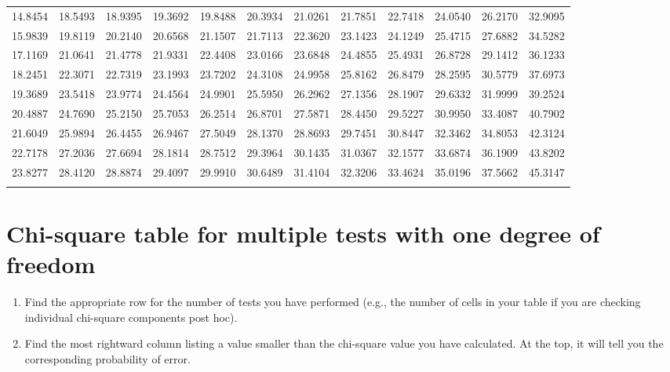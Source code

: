 \begin{table}[H]
{\begin{tabular}[t]{*{12}{S[table-format=2.4]}}
14.8454 & 18.5493 & 18.9395 & 19.3692 & 19.8488 & 20.3934 & 21.0261 & 21.7851 & 22.7418 & 24.0540 & 26.2170 & 32.9095 \\
15.9839 & 19.8119 & 20.2140 & 20.6568 & 21.1507 & 21.7113 & 22.3620 & 23.1423 & 24.1249 & 25.4715 & 27.6882 & 34.5282 \\
17.1169 & 21.0641 & 21.4778 & 21.9331 & 22.4408 & 23.0166 & 23.6848 & 24.4855 & 25.4931 & 26.8728 & 29.1412 & 36.1233 \\
18.2451 & 22.3071 & 22.7319 & 23.1993 & 23.7202 & 24.3108 & 24.9958 & 25.8162 & 26.8479 & 28.2595 & 30.5779 & 37.6973 \\
19.3689 & 23.5418 & 23.9774 & 24.4564 & 24.9901 & 25.5950 & 26.2962 & 27.1356 & 28.1907 & 29.6332 & 31.9999 & 39.2524 \\
20.4887 & 24.7690 & 25.2150 & 25.7053 & 26.2514 & 26.8701 & 27.5871 & 28.4450 & 29.5227 & 30.9950 & 33.4087 & 40.7902 \\
21.6049 & 25.9894 & 26.4455 & 26.9467 & 27.5049 & 28.1370 & 28.8693 & 29.7451 & 30.8447 & 32.3462 & 34.8053 & 42.3124 \\
22.7178 & 27.2036 & 27.6694 & 28.1814 & 28.7512 & 29.3964 & 30.1435 & 31.0367 & 32.1577 & 33.6874 & 36.1909 & 43.8202 \\
23.8277 & 28.4120 & 28.8874 & 29.4097 & 29.9910 & 30.6489 & 31.4104 & 32.3206 & 33.4624 & 35.0196 & 37.5662 & 45.3147 \\
\lspbottomrule
\end{tabular}}
\end{table}

\pagebreak

\section{Chi-square table for multiple tests with one degree of freedom}
\label{sec:chisquaremultiple}

\begin{enumerate}
  \item Find the appropriate row for the number of tests you have performed (e.g., the number of cells in your table if you are checking individual chi-square components post hoc).
  \item Find the most rightward column listing a value smaller than the chi-square value you have calculated. At the top, it will tell you the corresponding probability of error.
\end{enumerate}

